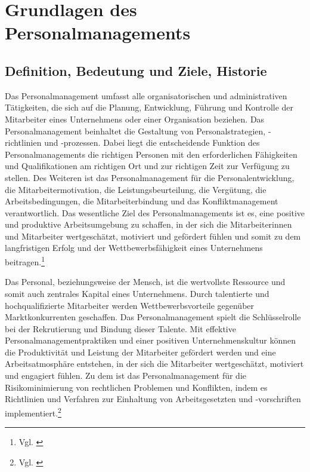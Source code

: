

\section{Grundlagen des Personalmanagements} 
\label{sec:grundlagenpersonalmanagement}

\subsection{Definition, Bedeutung und Ziele, Historie}
\label{sec:gl_definition}
Das Personalmanagement umfasst alle organisatorischen und administrativen Tätigkeiten, die sich auf die Planung, Entwicklung, Führung und Kontrolle der Mitarbeiter eines Unternehmens oder einer Organisation beziehen. Das Personalmanagement beinhaltet die Gestaltung von Personalstrategien, -richtlinien und -prozessen. Dabei liegt die entscheidende Funktion des Personalmanagements die richtigen Personen mit den erforderlichen Fähigkeiten und Qualifikationen am richtigen Ort und zur richtigen Zeit zur Verfügung zu stellen. Des Weiteren ist das Personalmanagement für die Personalentwicklung, die Mitarbeitermotivation, die Leistungsbeurteilung, die Vergütung, die Arbeitsbedingungen, die Mitarbeiterbindung und das Konfliktmanagement verantwortlich. Das wesentliche Ziel des Personalmanagements ist es, eine positive und produktive Arbeitsumgebung zu schaffen, in der sich die Mitarbeiterinnen und Mitarbeiter wertgeschätzt, motiviert und gefördert fühlen und somit zu dem langfristigen Erfolg und der Wettbewerbsfähigkeit eines Unternehmens beitragen.\footnote{Vgl. \cite{personio:PersoManagement}}

Das Personal, beziehungsweise der Mensch, ist die wertvollste Ressource und somit auch zentrales Kapital eines Unternehmens. Durch talentierte und hochqualifizierte Mitarbeiter werden Wettbewerbsvorteile gegenüber Marktkonkurrenten geschaffen. Das Personalmanagement spielt die Schlüsselrolle bei der Rekrutierung und Bindung dieser Talente. Mit effektive Personalmanagementpraktiken und einer positiven Unternehmenskultur können die Produktivität und Leistung der Mitarbeiter gefördert werden und eine Arbeitsatmosphäre entstehen, in der sich die Mitarbeiter wertgeschätzt, motiviert und engagiert fühlen. Zu dem ist das Personalmanagement für die Risikominimierung von rechtlichen Problemen und Konflikten, indem es Richtlinien und Verfahren zur Einhaltung von Arbeitsgesetzten und -vorschriften implementiert.\footnote{Vgl. \cite{lernort-mint:PMBedeutungZiele}}

